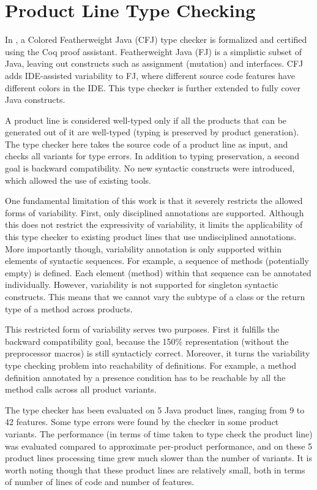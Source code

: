 \documentclass[11pt]{article}
\begin{document}
\section{Product Line Type Checking}

In \cite{Kastner:2012}, a Colored Featherweight Java (CFJ) type checker is formalized and certified using the Coq\cite{Bertot:2010} proof assistant. Featherweight Java (FJ) is a simplistic subset of Java, leaving out constructs such as assignment (mutation) and interfaces. CFJ adds IDE-assisted variability to FJ, where different source code features have different colors in the IDE. This type checker is further extended to fully cover Java constructs.

A product line is considered well-typed only if all the products that can be generated out of it are well-typed (typing is preserved by product generation). The type checker here takes the source code of a product line as input, and checks all variants for type errors. In addition to typing preservation, a second goal is backward compatibility. No new syntactic constructs were introduced, which allowed the use of existing tools.

One fundamental limitation of this work is that it severely restricts the allowed forms of variability. First, only disciplined annotations are supported. Although this does not restrict the expressivity of variability, it limits the applicability of this type checker to existing product lines that use undisciplined annotations. More importantly though, variability annotation is only supported within elements of syntactic sequences. For example, a sequence of methods (potentially empty) is defined. Each element (method) within that sequence can be annotated individually. However, variability is not supported for singleton syntactic constructs. This means that we cannot vary the subtype of a class or the return type of a method across products.

This restricted form of variability serves two purposes. First it fulfills the backward compatibility goal, because the 150\% representation (without the preprocessor macros) is still syntacticly correct. Moreover, it turns the variability type checking problem into reachability of definitions. For example, a method definition annotated by a presence condition has to be reachable by all the method calls across all product variants. 
 
The type checker has been evaluated on 5 Java product lines, ranging from 9 to 42 features. Some type errors were found by the checker in some product variants. The performance (in terms of time taken to type check the product line) was evaluated compared to approximate per-product performance, and on these 5 product lines processing time grew much slower than the number of variants. It is worth noting though that these product lines are relatively small, both in terms of number of lines of code and number of features. 
 
\end{document}
